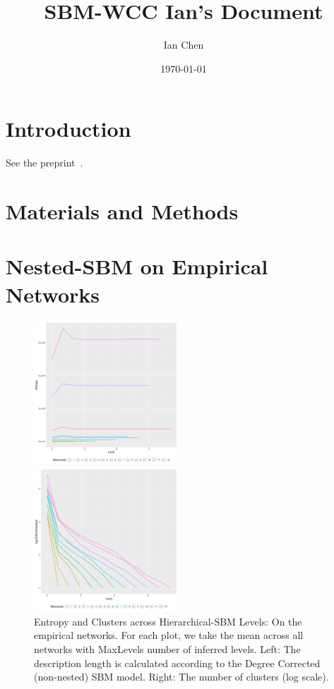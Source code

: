 \documentclass[aps,pre,superscriptaddress]{revtex4}
\begin{document}

\title{SBM-WCC Ian's Document}
\author{Ian Chen}
\date{\today}
\maketitle

\section{Introduction}
See the preprint~\cite{Park25-02}.

\section{Materials and Methods}

\section{Nested-SBM on Empirical Networks}

\begin{figure}
	\centering
	\begin{subfloat}
		\centering
		\includegraphics[width=0.48\textwidth]{fig1.pdf}
	\end{subfloat}
	\begin{subfloat}
		\centering
		\includegraphics[width=0.48\textwidth]{fig2.pdf}
	\end{subfloat}
	\caption{Entropy and Clusters across Hierarchical-SBM Levels:
		On the empirical networks.
		For each plot, we take the mean across all networks with MaxLevels number of inferred levels.
		Left: The description length is calculated according to the Degree Corrected (non-nested) SBM model.
		Right: The number of clusters (log scale).
	}
	\label{figs:fig1}
\end{figure}
\end{document}
